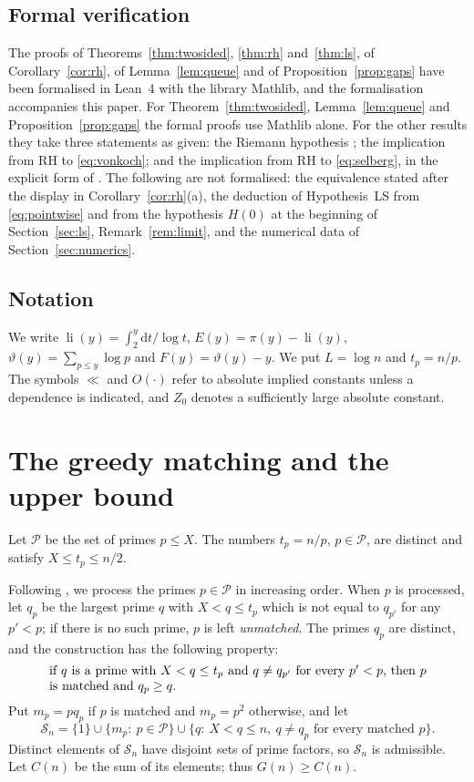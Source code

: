 \documentclass[11pt,reqno]{amsart}
\theoremstyle{definition}
\theoremstyle{remark}
\numberwithin{equation}{section}
\newcommand{\dd}{\mathrm{d}}
\newcommand{\cP}{\mathcal{P}}
\newcommand{\cS}{\mathcal{S}}
\DeclareMathOperator{\li}{li}
\begin{document}
\subsection{Formal verification}
The proofs of Theorems~\ref{thm:twosided}, \ref{thm:rh} and~\ref{thm:ls}, of Corollary~\ref{cor:rh}, of Lemma~\ref{lem:queue} and of Proposition~\ref{prop:gaps} have been formalised in Lean~4 with the library Mathlib, and the formalisation accompanies this paper. For Theorem~\ref{thm:twosided}, Lemma~\ref{lem:queue} and Proposition~\ref{prop:gaps} the formal proofs use Mathlib alone. For the other results they take three statements as given: the Riemann hypothesis \cite{Al}; the implication from RH to \eqref{eq:vonkoch}; and the implication from RH to \eqref{eq:selberg}, in the explicit form of \cite[Theorem~1]{CHD}. The following are not formalised: the equivalence stated after the display in Corollary~\ref{cor:rh}(a), the deduction of Hypothesis~LS from \eqref{eq:pointwise} and from the hypothesis $H(0)$ at the beginning of Section~\ref{sec:ls}, Remark~\ref{rem:limit}, and the numerical data of Section~\ref{sec:numerics}.

\subsection{Notation}
We write $\li(y)=\int_2^y\dd t/\log t$, $E(y)=\pi(y)-\li(y)$, $\vartheta(y)=\sum_{p\le y}\log p$ and $F(y)=\vartheta(y)-y$. We put $L=\log n$ and $t_p=n/p$. The symbols $\ll$ and $O(\cdot)$ refer to absolute implied constants unless a dependence is indicated, and $Z_0$ denotes a sufficiently large absolute constant.

\section{The greedy matching and the upper bound}\label{sec:greedy}

Let $\cP$ be the set of primes $p\le X$. The numbers $t_p=n/p$, $p\in\cP$, are distinct and satisfy $X\le t_p\le n/2$.

Following \cite{EvL}, we process the primes $p\in\cP$ in increasing order. When $p$ is processed, let $q_p$ be the largest prime $q$ with $X<q\le t_p$ which is not equal to $q_{p'}$ for any $p'<p$; if there is no such prime, $p$ is left \emph{unmatched}. The primes $q_p$ are distinct, and the construction has the following property:
\begin{equation}\label{eq:greedy}
 \parbox{0.86\textwidth}{if $q$ is a prime with $X<q\le t_p$ and $q\ne q_{p'}$ for every $p'<p$, then $p$ is matched and $q_p\ge q$.}
\end{equation}
Put $m_p=pq_p$ if $p$ is matched and $m_p=p^2$ otherwise, and let
\[
 \cS_n=\{1\}\cup\{m_p:\ p\in\cP\}\cup\{q:\ X<q\le n,\ q\ne q_p\text{ for every matched }p\}.
\]
Distinct elements of $\cS_n$ have disjoint sets of prime factors, so $\cS_n$ is admissible. Let $C(n)$ be the sum of its elements; thus $G(n)\ge C(n)$.
\end{document}
